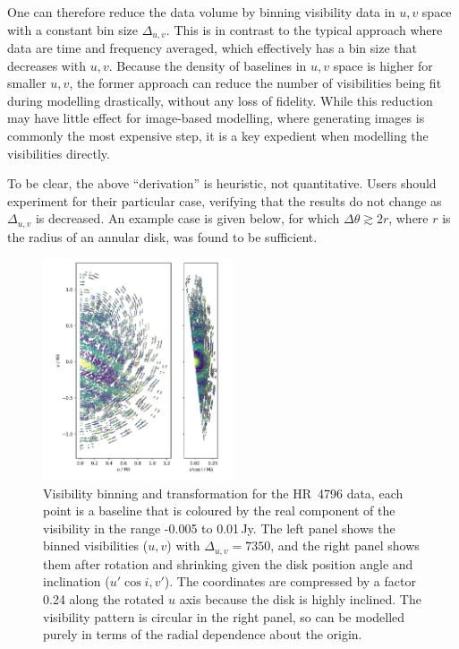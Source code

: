 \documentclass[fleqn,usenatbib]{rasti}
\begin{document}
One can therefore reduce the data volume by binning visibility data in $u,v$ space with a constant bin size $\Delta_{u,v}$. This is in contrast to the typical approach where data are time and frequency averaged, which effectively has a bin size that decreases with $u,v$. Because the density of baselines in $u,v$ space is higher for smaller $u,v$, the former approach can reduce the number of visibilities being fit during modelling drastically, without any loss of fidelity. While this reduction may have little effect for image-based modelling, where generating images is commonly the most expensive step, it is a key expedient when modelling the visibilities directly.

To be clear, the above ``derivation'' is heuristic, not quantitative. Users should experiment for their particular case, verifying that the results do not change as $\Delta_{u,v}$ is decreased. An example case is given below, for which $\Delta \theta \gtrsim 2r$, where $r$ is the radius of an annular disk, was found to be sufficient.

\begin{figure}
    \centering
    \hspace{-0.5cm}\includegraphics[width=0.5\textwidth]{vis_avg.png}
    \caption{Visibility binning and transformation for the HR~4796 data, each point is a baseline that is coloured by the real component of the visibility in the range -0.005 to 0.01\,Jy. The left panel shows the binned visibilities ($u, v$) with $\Delta_{u,v}=7350$, and the right panel shows them after rotation and shrinking given the disk position angle and inclination ($u' \cos i, v'$). The coordinates are compressed by a factor 0.24 along the rotated $u$ axis because the disk is highly inclined. The visibility pattern is circular in the right panel, so can be modelled purely in terms of the radial dependence about the origin.}
    \label{fig:bin}
\end{figure}
\end{document}
